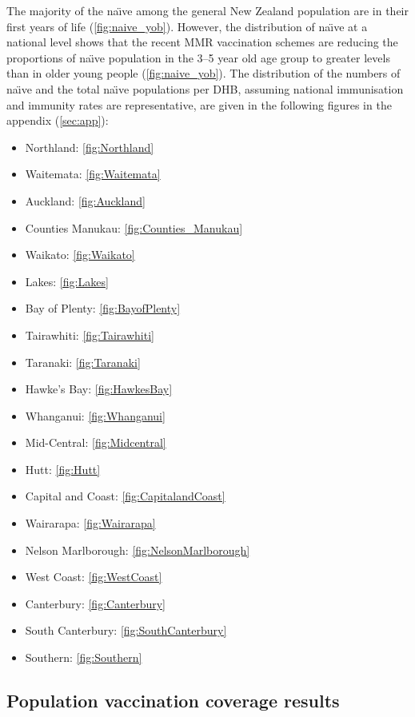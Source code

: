 \documentclass{article}
\begin{document}
The majority of the na\"{\i}ve among the general New Zealand population are in their first years of life (\autoref{fig:naive_yob}). However, the distribution of na\"{\i}ve at a national level shows that the recent MMR vaccination schemes are reducing the proportions of na\"{\i}ve population in the 3--5 year old age group to greater levels than in older young people  (\autoref{fig:naive_yob}). The distribution of the numbers of na\"{\i}ve and the total na\"{\i}ve populations per DHB, assuming national immunisation and immunity rates are representative, are given in the following figures in the appendix (\autoref{sec:app}): 
\begin{itemize}[noitemsep,nolistsep]
\item Northland: \autoref{fig:Northland}
\item Waitemata: \autoref{fig:Waitemata}
\item Auckland: \autoref{fig:Auckland}
\item Counties Manukau: \autoref{fig:Counties_Manukau}
\item Waikato: \autoref{fig:Waikato}
\item Lakes: \autoref{fig:Lakes}
\item Bay of Plenty: \autoref{fig:BayofPlenty}
\item Tairawhiti: \autoref{fig:Tairawhiti}
\item Taranaki: \autoref{fig:Taranaki}
\item Hawke's Bay: \autoref{fig:HawkesBay}
\item Whanganui: \autoref{fig:Whanganui}
\item Mid-Central: \autoref{fig:Midcentral}
\item Hutt: \autoref{fig:Hutt}
\item Capital and Coast: \autoref{fig:CapitalandCoast}
\item Wairarapa: \autoref{fig:Wairarapa}
\item Nelson Marlborough: \autoref{fig:NelsonMarlborough}
\item West Coast: \autoref{fig:WestCoast}
\item Canterbury: \autoref{fig:Canterbury}
\item South Canterbury: \autoref{fig:SouthCanterbury}
\item Southern: \autoref{fig:Southern}
\end{itemize}

\subsection{Population vaccination coverage results}
\label{sub:popvac}
\end{document}
